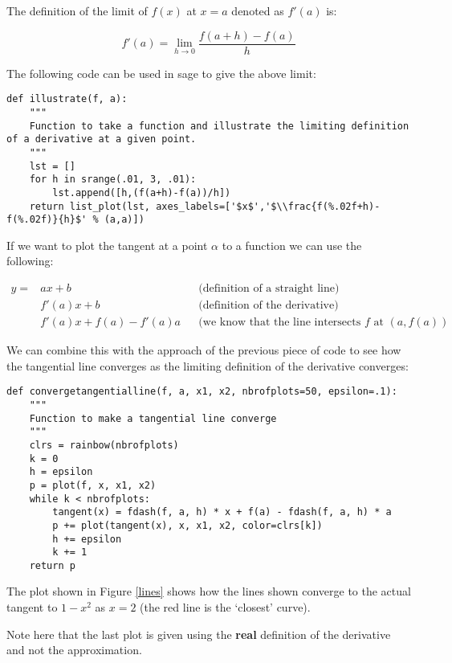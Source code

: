 \documentclass[a4paper]{article}
\begin{document}
The definition of the limit of $f(x)$ at $x=a$ denoted as $f'(a)$ is:

\begin{equation}
f'(a) = \lim_{h\to0}\frac{f(a+h)-f(a)}{h}
\end{equation}

The following code can be used in sage to give the above limit:

\begin{verbatim}
def illustrate(f, a):
    """
    Function to take a function and illustrate the limiting definition of a derivative at a given point.
    """
    lst = []
    for h in srange(.01, 3, .01):
    	lst.append([h,(f(a+h)-f(a))/h])
    return list_plot(lst, axes_labels=['$x$','$\\frac{f(%.02f+h)-f(%.02f)}{h}$' % (a,a)])
\end{verbatim}



If we want to plot the tangent at a point $\alpha$ to a function we can use the following:

\begin{align}
y=&ax+b&&\text{(definition of a straight line)}\nonumber\\
  &f'(a)x+b&&\text{(definition of the derivative)}\nonumber\\
  &f'(a)x+f(a)-f'(a)a&&\text{(we know that the line intersects $f$ at $(a,f(a))$}\nonumber
\end{align}

We can combine this with the approach of the previous piece of code to see how the tangential line converges as the limiting definition of the derivative converges:

\begin{verbatim}
def convergetangentialline(f, a, x1, x2, nbrofplots=50, epsilon=.1):
    """
    Function to make a tangential line converge
    """
    clrs = rainbow(nbrofplots)
    k = 0
    h = epsilon
    p = plot(f, x, x1, x2)
    while k < nbrofplots:
        tangent(x) = fdash(f, a, h) * x + f(a) - fdash(f, a, h) * a
        p += plot(tangent(x), x, x1, x2, color=clrs[k])
        h += epsilon
        k += 1
    return p
\end{verbatim}

The plot shown in Figure \ref{lines} shows how the lines shown converge to the actual tangent to $1-x^2$ as $x=2$ (the red line is the `closest' curve).


Note here that the last plot is given using the \textbf{real} definition of the derivative and not the approximation.
\end{document}
